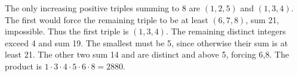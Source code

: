 The only increasing positive triples summing to 8 are $(1,2,5)$ and $(1,3,4)$. The first would force the remaining triple to be at least $(6,7,8)$, sum 21, impossible. Thus the first triple is $(1,3,4)$. The remaining distinct integers exceed 4 and sum 19. The smallest must be 5, since otherwise their sum is at least 21. The other two sum 14 and are distinct and above 5, forcing 6,8. The product is $1\cdot3\cdot4\cdot5\cdot6\cdot8=\boxed{2880}$.
